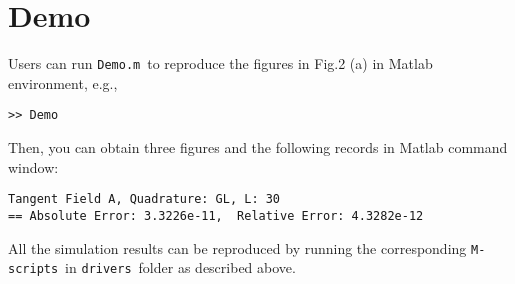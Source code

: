 \documentclass[preprint]{acmart}
\newcommand{\hlgtexttt}[1]{\texttt{\colorbox{lightgray!15}{#1}}}
\newcommand{\code}[1]{\hlgtexttt{#1}\,}
\begin{document}
\section{Demo}\label{sec:vsh}
Users can run \code{Demo.m} to reproduce the figures in Fig.2 (a) in Matlab environment, e.g.,
\begin{lstlisting}
>> Demo
\end{lstlisting}
Then, you can obtain three figures and the following records in Matlab command window:
\begin{lstlisting}
Tangent Field A, Quadrature: GL, L: 30
== Absolute Error: 3.3226e-11,  Relative Error: 4.3282e-12
\end{lstlisting}

All the simulation results can be reproduced by running the corresponding \code{M-scripts} in \code{drivers} folder as described above.




%


\end{document}
